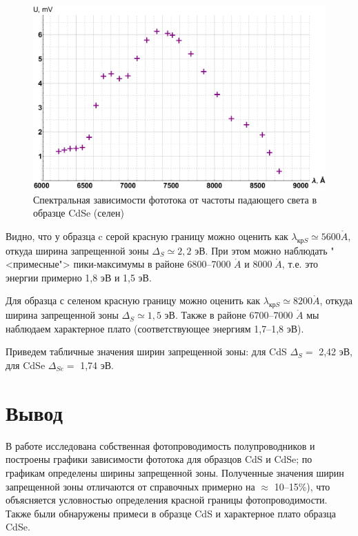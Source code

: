 \documentclass[12pt]{kiarticle} %
\newcommand{\an}{\ensuremath{\mathring{A}}}
\begin{document}
\begin{figure}[h]
	\includegraphics[scale=0.47]{se.pdf}
	\caption{Спектральная зависимости фототока от частоты падающего света в образце CdSe (селен)}
	\label{graf_se}
\end{figure}
	
	Видно, что у образца  c серой красную границу можно оценить как $ \lambda_{кр S} \simeq 5600 \an $, откуда ширина запрещенной зоны $ \Delta_S \simeq 2,2 $ эВ. При этом можно наблюдать "<примесные"> пики-максимумы в районе 6800--7000 $ \an $ и $ 8000 \; \an $, т.е. это энергии примерно 1,8 эВ и 1,5 эВ. 
	
	Для образца с селеном красную границу можно оценить как $ \lambda_{кр S} \simeq 8200 \an $, откуда ширина запрещенной зоны $ \Delta_S \simeq 1,5 $ эВ. Также в районе 6700--7000 $ \an $ мы наблюдаем характерное плато (соответствующее энергиям 1,7--1,8 эВ).
	
	Приведем табличные значения ширин запрещенной зоны: для CdS $ \Delta_S =$ 2,42 эВ, для CdSe $ \Delta_{Se} = $ 1,74 эВ.
	
	\section{Вывод }
	
	В работе исследована собственная фотопроводимость полупроводников и построены графики зависимости фототока для образцов CdS и CdSe; по графикам определены ширины запрещенной зоны. Полученные значения ширин запрещенной зоны  отличаются от справочных примерно на $ \approx $ 10--15\%), что объясняется условностью определения красной границы фотопроводимости. Также были обнаружены примеси в образце CdS и характерное плато образца CdSe.
	
\end{document}
